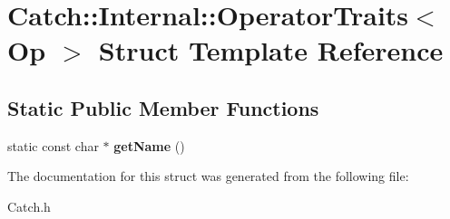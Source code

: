 \hypertarget{struct_catch_1_1_internal_1_1_operator_traits}{\section{Catch\-:\-:Internal\-:\-:Operator\-Traits$<$ Op $>$ Struct Template Reference}
\label{struct_catch_1_1_internal_1_1_operator_traits}
}
\subsection*{Static Public Member Functions}
\begin{DoxyCompactItemize}
\item 
\hypertarget{struct_catch_1_1_internal_1_1_operator_traits_ac6d08082ea33348d42bc4ccbd6d07671}{static const char $\ast$ {\bfseries get\-Name} ()}\label{struct_catch_1_1_internal_1_1_operator_traits_ac6d08082ea33348d42bc4ccbd6d07671}

\end{DoxyCompactItemize}


The documentation for this struct was generated from the following file\-:\begin{DoxyCompactItemize}
\item 
Catch.\-h\end{DoxyCompactItemize}
